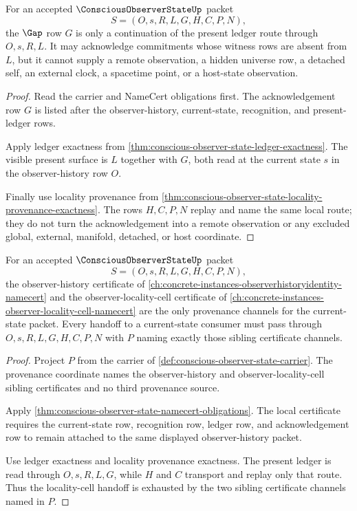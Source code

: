 \begin{theorem}
\label{thm:conscious-observer-state-gap-ledger-route}
For an accepted $\ConsciousObserverStateUp$ packet
$$
S=(O,s,R,L,G,H,C,P,N),
$$
the $\Gap$ row $G$ is only a continuation of the present ledger route through $O,s,R,L$. It may acknowledge commitments whose witness rows are absent from $L$, but it cannot supply a remote observation, a hidden universe row, a detached self, an external clock, a spacetime point, or a host-state observation.
\end{theorem}
\begin{proof}
Read the carrier and NameCert obligations first. The acknowledgement row $G$ is listed after the observer-history, current-state, recognition, and present-ledger rows.

Apply ledger exactness from \autoref{thm:conscious-observer-state-ledger-exactness}. The visible present surface is $L$ together with $G$, both read at the current state $s$ in the observer-history row $O$.

Finally use locality provenance from \autoref{thm:conscious-observer-state-locality-provenance-exactness}. The rows $H,C,P,N$ replay and name the same local route; they do not turn the acknowledgement into a remote observation or any excluded global, external, manifold, detached, or host coordinate.
\end{proof}

\begin{theorem}
\label{thm:conscious-observer-state-locality-cell-handoff}
For an accepted $\ConsciousObserverStateUp$ packet
$$
S=(O,s,R,L,G,H,C,P,N),
$$
the observer-history certificate of \autoref{ch:concrete-instances-observerhistoryidentity-namecert} and the observer-locality-cell certificate of \autoref{ch:concrete-instances-observer-locality-cell-namecert} are the only provenance channels for the current-state packet. Every handoff to a current-state consumer must pass through $O,s,R,L,G,H,C,P,N$ with $P$ naming exactly those sibling certificate channels.
\end{theorem}
\begin{proof}
Project $P$ from the carrier of \autoref{def:conscious-observer-state-carrier}. The provenance coordinate names the observer-history and observer-locality-cell sibling certificates and no third provenance source.

Apply \autoref{thm:conscious-observer-state-namecert-obligations}. The local certificate requires the current-state row, recognition row, ledger row, and acknowledgement row to remain attached to the same displayed observer-history packet.

Use ledger exactness and locality provenance exactness. The present ledger is read through $O,s,R,L,G$, while $H$ and $C$ transport and replay only that route. Thus the locality-cell handoff is exhausted by the two sibling certificate channels named in $P$.
\end{proof}

